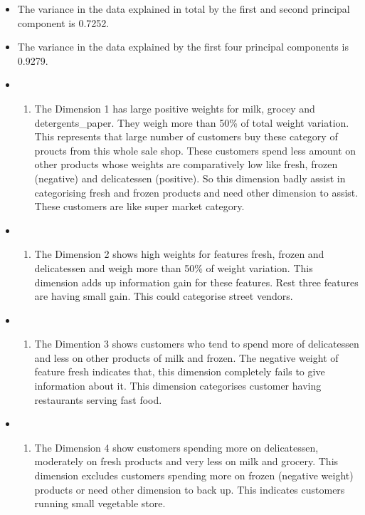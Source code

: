 \documentclass[11pt]{article}
\providecommand{\tightlist}{%
      \setlength{\itemsep}{0pt}\setlength{\parskip}{0pt}}
\begin{document}
\begin{itemize}
\item
  The variance in the data explained in total by the first and second
  principal component is 0.7252.
\item
  The variance in the data explained by the first four principal
  components is 0.9279.
\item
  \begin{enumerate}
  \def\labelenumi{\arabic{enumi})}
  \tightlist
  \item
    The Dimension 1 has large positive weights for milk, grocey and
    detergents\_paper. They weigh more than 50\% of total weight
    variation. This represents that large number of customers buy these
    category of proucts from this whole sale shop. These customers spend
    less amount on other products whose weights are comparatively low
    like fresh, frozen (negative) and delicatessen (positive). So this
    dimension badly assist in categorising fresh and frozen products and
    need other dimension to assist. These customers are like super
    market category.
  \end{enumerate}
\item
  \begin{enumerate}
  \def\labelenumi{\arabic{enumi})}
  \setcounter{enumi}{1}
  \tightlist
  \item
    The Dimension 2 shows high weights for features fresh, frozen and
    delicatessen and weigh more than 50\% of weight variation. This
    dimension adds up information gain for these features. Rest three
    features are having small gain. This could categorise street
    vendors.
  \end{enumerate}
\item
  \begin{enumerate}
  \def\labelenumi{\arabic{enumi})}
  \setcounter{enumi}{2}
  \tightlist
  \item
    The Dimention 3 shows customers who tend to spend more of
    delicatessen and less on other products of milk and frozen. The
    negative weight of feature fresh indicates that, this dimension
    completely fails to give information about it. This dimension
    categorises customer having restaurants serving fast food.
  \end{enumerate}
\item
  \begin{enumerate}
  \def\labelenumi{\arabic{enumi})}
  \setcounter{enumi}{3}
  \tightlist
  \item
    The Dimension 4 show customers spending more on delicatessen,
    moderately on fresh products and very less on milk and grocery. This
    dimension excludes customers spending more on frozen (negative
    weight) products or need other dimension to back up. This indicates
    customers running small vegetable store.
  \end{enumerate}
\end{itemize}
\end{document}
